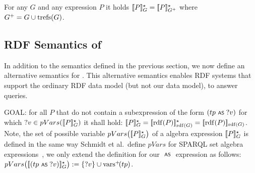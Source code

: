 \begin{proposition}
	For any {\RDFplusGraph} $G$ and any {\SPARQLplus} expression $P$ it holds $[\![P]\!]^\star_{G} = [\![P]\!]^\star_{G^+}$ where $G^+ = G \cup \mathrm{trefs}(G)$.
\end{proposition}



\subsection{RDF Semantics of {\SPARQLplus}}
	In addition to the {\SPARQLplus} semantics defined in the previous section, we now define an alternative semantics for {\SPARQLplus}. This alternative semantics enables RDF systems that support the ordinary RDF data model (but not our {\RDFplus} data model), to answer {\SPARQLplus} queries.


GOAL: for all $P$ that do not contain a subexpression of the form $(tp \text{ \normalfont\scriptsize\textsf{AS} } ?v)$ for which $?v \in pVars([\![P]\!]^\star_{G})$ it shall hold: $[\![P]\!]^\star_{G} = [\![\mathrm{rdf}(P)]\!]^\star_{\mathrm{rdf}(G)} = [\![\mathrm{rdf}(P)]\!]_{\mathrm{rdf}(G)}$. Note, the set of possible variable $pVars\bigl([\![P]\!]^\star_{G}\bigr)$ of a {\SPARQLplus} algebra expression $[\![P]\!]^\star_{G}$ is defined in the same way Schmidt et al.~define $pVars$ for SPARQL set algebra expressions~\cite{Schmidt10:FoundationsOfSPARQLOptimization}, we only extend the definition for our $\text{ \normalfont\scriptsize\textsf{AS} }$ expression as follows: $pVars\bigl([\![(tp \text{ \normalfont\scriptsize\textsf{AS} } ?v)]\!]^\star_{G}\bigr) := \lbrace ?v \rbrace \cup \mathrm{vars}^+\!(tp)$.

